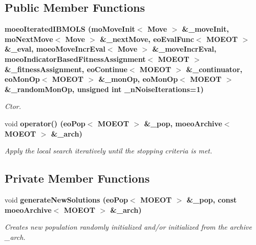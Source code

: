 \subsection*{Public Member Functions}
\begin{CompactItemize}
\item 
\bf{moeo\-Iterated\-IBMOLS} (mo\-Move\-Init$<$ Move $>$ \&\_\-move\-Init, mo\-Next\-Move$<$ Move $>$ \&\_\-next\-Move, \bf{eo\-Eval\-Func}$<$ MOEOT $>$ \&\_\-eval, \bf{moeo\-Move\-Incr\-Eval}$<$ Move $>$ \&\_\-move\-Incr\-Eval, \bf{moeo\-Indicator\-Based\-Fitness\-Assignment}$<$ MOEOT $>$ \&\_\-fitness\-Assignment, \bf{eo\-Continue}$<$ MOEOT $>$ \&\_\-continuator, \bf{eo\-Mon\-Op}$<$ MOEOT $>$ \&\_\-mon\-Op, \bf{eo\-Mon\-Op}$<$ MOEOT $>$ \&\_\-random\-Mon\-Op, unsigned int \_\-n\-Noise\-Iterations=1)
\begin{CompactList}\small\item\em Ctor. \item\end{CompactList}\item 
void \bf{operator()} (\bf{eo\-Pop}$<$ MOEOT $>$ \&\_\-pop, \bf{moeo\-Archive}$<$ MOEOT $>$ \&\_\-arch)
\begin{CompactList}\small\item\em Apply the local search iteratively until the stopping criteria is met. \item\end{CompactList}\end{CompactItemize}
\subsection*{Private Member Functions}
\begin{CompactItemize}
\item 
void \bf{generate\-New\-Solutions} (\bf{eo\-Pop}$<$ MOEOT $>$ \&\_\-pop, const \bf{moeo\-Archive}$<$ MOEOT $>$ \&\_\-arch)
\begin{CompactList}\small\item\em Creates new population randomly initialized and/or initialized from the archive \_\-arch. \item\end{CompactList}\end{CompactItemize}
